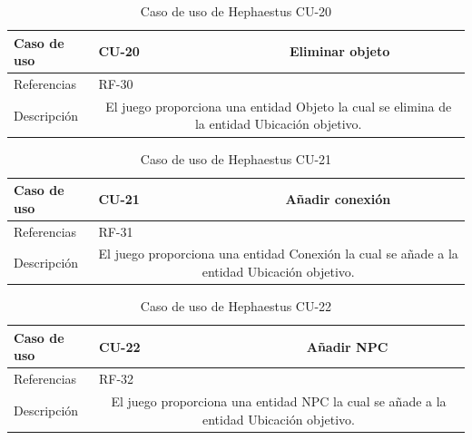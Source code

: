 \begin{table}[H]
	\centering
	\small
	\begin{tabularx}{\linewidth}{|l|cc|}
		\hline
		{\cellcolor[HTML]{C0C0C0} Caso de uso} & \multicolumn{1}{l|}{CU-20} & Eliminar objeto \\ \hline
		{\cellcolor[HTML]{C0C0C0} Referencias} & \multicolumn{2}{l|}{RF-30} \\ \hline
		{\cellcolor[HTML]{C0C0C0} Descripción} & \multicolumn{2}{X|}{El juego proporciona una entidad Objeto la cual se elimina de la entidad Ubicación objetivo.} \\ \hline
	\end{tabularx}
	
	\vspace{0.5cm}
	\caption{Caso de uso de Hephaestus CU-20}
	\label{tab:hephaestus-cu-20}
\end{table}

\begin{table}[H]
	\centering
	\small
	\begin{tabularx}{\linewidth}{|l|cc|}
		\hline
		{\cellcolor[HTML]{C0C0C0} Caso de uso} & \multicolumn{1}{l|}{CU-21} & Añadir conexión \\ \hline
		{\cellcolor[HTML]{C0C0C0} Referencias} & \multicolumn{2}{l|}{RF-31} \\ \hline
		{\cellcolor[HTML]{C0C0C0} Descripción} & \multicolumn{2}{X|}{El juego proporciona una entidad Conexión la cual se añade a la entidad Ubicación objetivo.} \\ \hline
	\end{tabularx}
	
	\vspace{0.5cm}
	\caption{Caso de uso de Hephaestus CU-21}
	\label{tab:hephaestus-cu-21}
\end{table}

\begin{table}[H]
	\centering
	\small
	\begin{tabularx}{\linewidth}{|l|cc|}
		\hline
		{\cellcolor[HTML]{C0C0C0} Caso de uso} & \multicolumn{1}{l|}{CU-22} & Añadir NPC \\ \hline
		{\cellcolor[HTML]{C0C0C0} Referencias} & \multicolumn{2}{l|}{RF-32} \\ \hline
		{\cellcolor[HTML]{C0C0C0} Descripción} & \multicolumn{2}{X|}{El juego proporciona una entidad NPC la cual se añade a la entidad Ubicación objetivo.} \\ \hline
	\end{tabularx}
	
	\vspace{0.5cm}
	\caption{Caso de uso de Hephaestus CU-22}
	\label{tab:hephaestus-cu-22}
\end{table}

